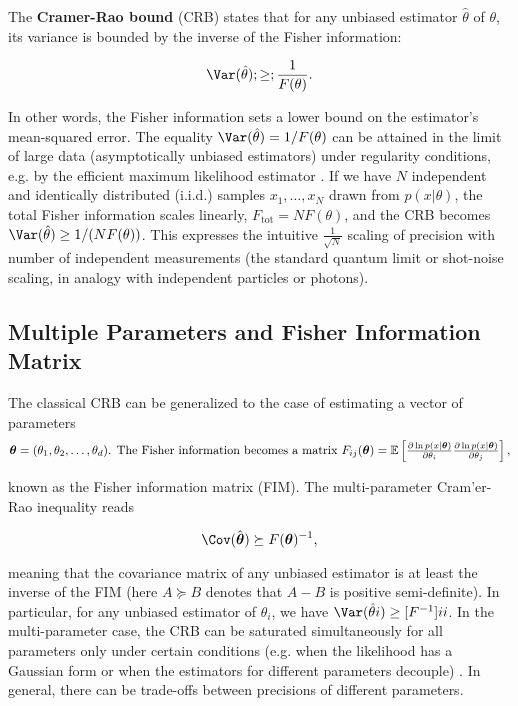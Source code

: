 The \textbf{Cramer-Rao bound} (CRB) states that for any unbiased
estimator $\hat{\theta}$ of $\theta$, its variance is bounded by the
inverse of the Fisher information:

\begin{equation}
\Var(\hat{\theta}) ;\ge; \frac{1}{F(\theta)}.
\label{eq:CRB-classical}
\end{equation}

In other words, the Fisher information sets a lower bound on the
estimator’s mean-squared error. The equality $\Var(\hat{\theta}) =
1/F(\theta)$ can be attained in the limit of large data
(asymptotically unbiased estimators) under regularity conditions,
e.g. by the efficient maximum likelihood estimator \cite{Kay1993}. If
we have $N$ independent and identically distributed (i.i.d.) samples
$x_1,\dots,x_N$ drawn from $p(x|\theta)$, the total Fisher information
scales linearly, $F_{\text{tot}} = N F(\theta)$, and the CRB becomes
$\Var(\hat{\theta}) \ge 1/(N F(\theta))$. This expresses the intuitive
$\frac{1}{\sqrt{N}}$ scaling of precision with number of independent
measurements (the standard quantum limit or shot-noise scaling, in
analogy with independent particles or photons).



\subsection{Multiple Parameters and Fisher Information Matrix}



The classical CRB can be generalized to the case of estimating a
vector of parameters
\[
\vec{\theta} =
(\theta_1,\theta_2,\dots,\theta_d)$. The Fisher information becomes a
matrix $F_{ij}(\vec{\theta}) = \mathbb{E}\left[ \frac{\partial \ln
    p(x|\vec{\theta})}{\partial \theta_i}\frac{\partial \ln
    p(x|\vec{\theta})}{\partial \theta_j} \right],
\]

known as the Fisher information matrix (FIM). The multi-parameter
Cram'er-Rao inequality reads

\begin{equation}
\Cov(\hat{\vec{\theta}}) \succeq F(\vec{\theta})^{-1},
\end{equation}

meaning that the covariance matrix of any unbiased estimator is at
least the inverse of the FIM (here $A \succeq B$ denotes that $A - B$
is positive semi-definite). In particular, for any unbiased estimator
of $\theta_i$, we have $\Var(\hat{\theta}i) \ge [F^{-1}]{ii}$. In the
multi-parameter case, the CRB can be saturated simultaneously for all
parameters only under certain conditions (e.g. when the likelihood has
a Gaussian form or when the estimators for different parameters
decouple) \cite{Kay1993}. In general, there can be trade-offs between
precisions of different parameters.



